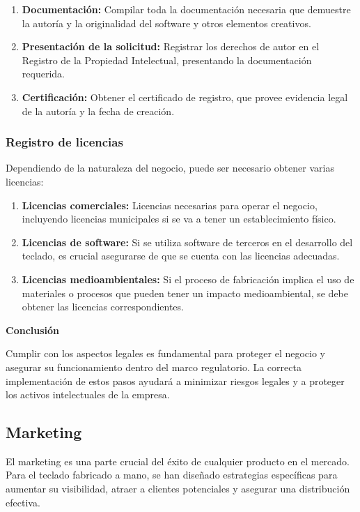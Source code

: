 \begin{enumerate}
    \item \textbf{Documentación:} Compilar toda la documentación necesaria que demuestre la autoría y la originalidad del software y otros elementos creativos.
    \item \textbf{Presentación de la solicitud:} Registrar los derechos de autor en el Registro de la Propiedad Intelectual, presentando la documentación requerida.
    \item \textbf{Certificación:} Obtener el certificado de registro, que provee evidencia legal de la autoría y la fecha de creación.
\end{enumerate}

\subsubsection{Registro de licencias}

Dependiendo de la naturaleza del negocio, puede ser necesario obtener varias licencias:

\begin{enumerate}
    \item \textbf{Licencias comerciales:} Licencias necesarias para operar el negocio, incluyendo licencias municipales si se va a tener un establecimiento físico.
    \item \textbf{Licencias de software:} Si se utiliza software de terceros en el desarrollo del teclado, es crucial asegurarse de que se cuenta con las licencias adecuadas.
    \item \textbf{Licencias medioambientales:} Si el proceso de fabricación implica el uso de materiales o procesos que pueden tener un impacto medioambiental, se debe obtener las licencias correspondientes.
\end{enumerate}

\textbf{Conclusión}

Cumplir con los aspectos legales es fundamental para proteger el negocio y asegurar su funcionamiento dentro del marco regulatorio. La correcta implementación de estos pasos ayudará a minimizar riesgos legales y a proteger los activos intelectuales de la empresa.


\subsection{Marketing}

El marketing es una parte crucial del éxito de cualquier producto en el mercado. Para el teclado fabricado a mano, se han diseñado estrategias específicas para aumentar su visibilidad, atraer a clientes potenciales y asegurar una distribución efectiva.

